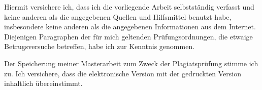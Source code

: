 \documentclass
[
	12pt,
	english,
	listof=totoc,
	bibliography=totoc,
	parskip,
]{scrartcl}
\begin{document}


{}

\newpage

\tableofcontents
\newpage
















\newpage
\printbibliography[title=Bibliography]
\newpage

\begin{acronym}[HTTPS] %
\end{acronym}
\newpage


 


Hiermit versichere ich, dass ich die vorliegende Arbeit selbstständig verfasst und keine anderen als die angegebenen Quellen und Hilfsmittel benutzt habe, insbesondere keine anderen als die angegebenen Informationen aus dem Internet. Diejenigen Paragraphen der für mich geltenden Prüfungsordnungen, die etwaige Betrugsversuche betreffen, habe ich zur Kenntnis genommen.

Der Speicherung meiner Masterarbeit zum Zweck der Plagiatsprüfung stimme ich zu. Ich
versichere, dass die elektronische Version mit der gedruckten Version inhaltlich übereinstimmt.
\end{document}
